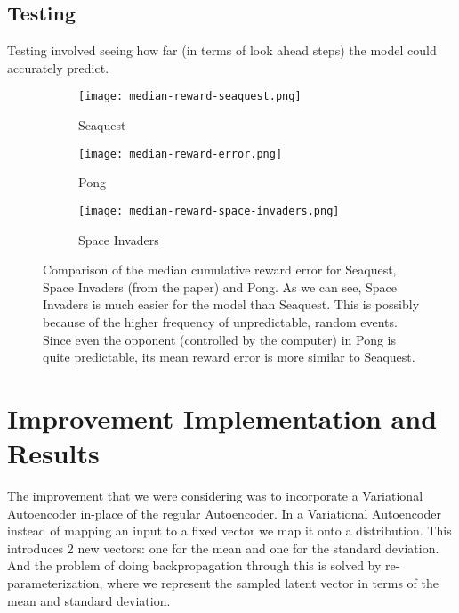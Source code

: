 \documentclass[12pt, a4paper, oneside]{report}
\begin{document}
        \section{Testing} 
            \par Testing involved seeing how far (in terms of look ahead steps) the model could accurately predict.
            \begin{figure}[h!]
                \centering
                \begin{subfigure}[b]{0.3\textwidth}
                    \centering
                    \texttt{[image: median-reward-seaquest.png]}
                    \caption{Seaquest}
                \end{subfigure}
                \begin{subfigure}[b]{0.3\textwidth}
                    \centering
                    \texttt{[image: median-reward-error.png]}
                    \caption{Pong}
                \end{subfigure}
                \hfill
                \begin{subfigure}[b]{0.3\textwidth}
                    \centering
                    \texttt{[image: median-reward-space-invaders.png]}
                    \caption{Space Invaders}
                \end{subfigure}
                \caption[Median cumulative reward error comparison]{Comparison of the median cumulative reward error for Seaquest, Space Invaders (from the paper) and Pong. As we can see, Space Invaders is much easier for the model than Seaquest. This is possibly because of the higher frequency of unpredictable, random events. Since even the opponent (controlled by the computer) in Pong is quite predictable, its mean reward error is more similar to Seaquest.}
            \end{figure}

    \chapter{Improvement Implementation and Results}
            \par The improvement that we were considering was to incorporate a Variational Autoencoder in-place of the regular Autoencoder. In a Variational Autoencoder instead of mapping an input to a fixed vector we map it onto a distribution. This introduces 2 new vectors: one for the mean and one for the standard deviation. And the problem of doing backpropagation through this is solved by re-parameterization, where we represent the sampled latent vector in terms of the mean and standard deviation. 
\end{document}
